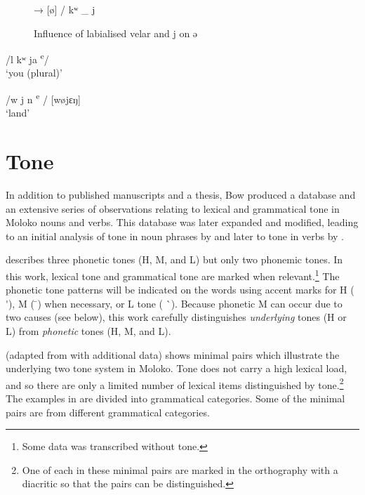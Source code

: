 \begin{figure}
\begin{centering}[ə] →  [ø] /   kʷ \_ j\end{centering}
\caption{Influence of labialised velar and j on ə\label{fig:2.7}}
\end{figure}

\ea \label{ex:2:46}
\textup{/l kʷ ja \textsuperscript{e}}\textup{/  \ExampleSpace  [lʊkʷøjɛ]}\\
\glt  ‘you (plural)’
\z

\ea \label{ex:2:47}
\textup{/w j n \textsuperscript{e}}\textup{ /  \ExampleSpace \hspace{2pt}  [wøjɛŋ}\textup{]}\\
\glt  ‘land’
\z

\section{Tone}\label{sec:2.4}
\hypertarget{RefHeading1210621525720847}{}
In addition to published manuscripts and a thesis, Bow produced a database and an extensive series of observations relating to lexical and grammatical tone in Moloko nouns and verbs.  This database was later expanded and modified, leading to an initial analysis of tone in noun phrases by \citet{Boyd2002} and later to tone in verbs by \citet{FriesenMamalis2008}.  

\citet{Bow1997c} describes three phonetic tones (H, M, and L) but only two phonemic tones. In this work, lexical tone and grammatical tone are marked when relevant.\footnote{Some data was transcribed without tone.}  The phonetic tone patterns will be indicated on the words using accent marks for H (  \'{ }), M (  \={ }) when necessary, or L tone (  \`{ }).  Because phonetic M can occur due to two causes (see below), this work carefully distinguishes \textit{underlying} tones (H or L) from \textit{phonetic} tones (H, M, and L).

 (adapted from \citealt{Bow1997c} with additional data) shows minimal pairs which illustrate the underlying two tone system in Moloko. Tone does not carry a high lexical load, and so there are only a limited number of lexical items distinguished by tone.\footnote{One of each in these minimal pairs are marked in the orthography with a diacritic so that the pairs can be distinguished. } The examples in  are divided into grammatical categories. Some of the minimal pairs are from different grammatical categories. 

